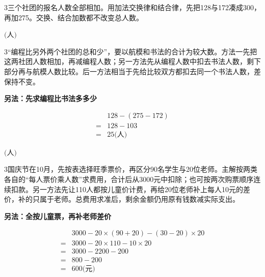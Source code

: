 \documentclass[multi=snippet,border={5bp 20bp 5bp 5bp}]{standalone}
\newenvironment{snippet}[3]{\begin{minipage}{#1bp}\color{answerred}\fontsize{#2}{#3}\selectfont\raggedright}{\end{minipage}}
\begin{document}
\begin{snippet}{505}{11.5}{14}\begin{multicols}{3}\raggedcolumns 三个社团的报名人数全部相加。用加法交换律和结合律，先把128与172凑成300，再加275。交换、结合加数都不改变总人数。\end{multicols}\end{snippet}
\begin{snippet}{80}{9.5}{14}\SourceSans\setlength{\mathindent}{2bp}\(\text{(人)}\)\end{snippet}
\begin{snippet}{505}{11.5}{14}\begin{multicols}{3}\raggedcolumns “编程比另外两个社团的总和少”，要以航模和书法的合计为较大数。方法一先把这两社团人数相加，再减编程人数；另一方法先从编程人数中扣去书法人数，剩下部分再与航模人数比较。后一方法相当于先给比较双方都扣去同一个书法人数，差保持不变。\par \textbf{另法：先求编程比书法多多少}\par \[\begin{aligned}&128-(275-172)\\={}&128-103\\={}&25\text{(人)}\end{aligned}\]\end{multicols}\end{snippet}
\begin{snippet}{80}{9.5}{14}\SourceSans\setlength{\mathindent}{2bp}\(\text{(人)}\)\end{snippet}
\begin{snippet}{505}{11.5}{14}\begin{multicols}{3}\raggedcolumns 国庆节在10月，先按表选择旺季票价，再区分90名学生与20位老师。主解按两类各自的“每人票价乘人数”求费用，合计后从3000元中扣除；也可按两次购票顺序连续扣款。另一方法先让110人都按儿童价计费，再给20位老师补上每人10元的差价，补的只属于老师。总费用求准后，剩余金额仍用原有钱数减实际支出。\par \textbf{另法：全按儿童票，再补老师差价}\par \end{multicols}\[\begin{aligned}&3000-20\times(90+20)-(30-20)\times20\\={}&3000-20\times110-10\times20\\={}&3000-2200-200\\={}&800-200\\={}&600\text{(元)}\end{aligned}\]\end{snippet}
\end{document}
